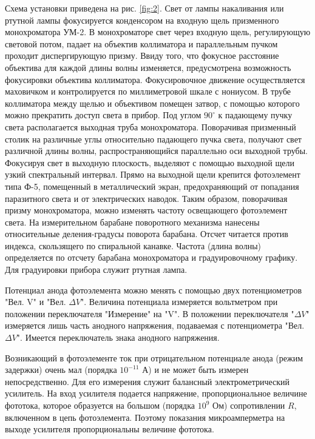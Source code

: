 Схема установки приведена на рис. \ref{fig:2}. Свет от лампы накаливания или ртутной лампы фокусируется конденсором на входную щель призменного монохроматора УМ-2. В монохроматоре свет через входную щель, регулирующую световой потом, падает на объектив коллиматора и параллельным пучком проходит диспергирующую призму. Ввиду того, что фокусное расстояние объектива для каждой длины волны изменяется, предусмотрена возможность фокусировки объектива коллиматора. Фокусировочное движение осуществляется маховичком и контролируется по миллиметровой шкале с нониусом. В трубе коллиматора между щелью и объективом помещен затвор, с помощью которого можно прекратить доступ света в прибор. Под углом $90^{\circ}$ к падающему пучку света располагается выходная труба монохроматора. Поворачивая призменный столик на различные углы относительно падающего пучка света, получают свет различной длины волны, распространяющийся параллельно оси выходной трубы. Фокусируя свет в выходную плоскость, выделяют с помощью выходной щели узкий спектральный интервал. Прямо на выходной щели крепится фотоэлемент типа Ф-5, помещенный в металлический экран, предохраняющий от попадания паразитного света и от электрических наводок. Таким образом, поворачивая призму монохроматора, можно изменять частоту освещающего фотоэлемент света. На измерительном барабане поворотного механизма нанесены относительные деления-градусы поворота барабана. Отсчет читается против индекса, скользящего по спиральной канавке. Частота (длина волны) определяется по отсчету барабана монохроматора и градуировочному графику. Для градуировки прибора служит ртутная лампа.

Потенциал анода фотоэлемента можно менять с помощью двух потенциометров "Вел. V" и "Вел. $\Delta V$". Величина потенциала измеряется вольтметром при положении переключателя "Измерение" на "V". В положении переключателя "$\Delta V$" измеряется лишь часть анодного напряжения, подаваемая с потенциометра "Вел. $\Delta V$". Имеется переключатель знака анодного напряжения.

Возникающий в фотоэлементе ток при отрицательном потенциале анода (режим задержки) очень мал (порядка $10^{-11}$ А) и не может быть измерен непосредственно. Для его измерения служит балансный электрометрический усилитель. На вход усилителя подается напряжение, пропорциональное величине фототока, которое образуется на большом (порядка $10^9$ Ом) сопротивлении $R$, включенном в цепь фотоэлемента. Поэтому показания микроамперметра на выходе усилителя пропорциональны величине фототока.

